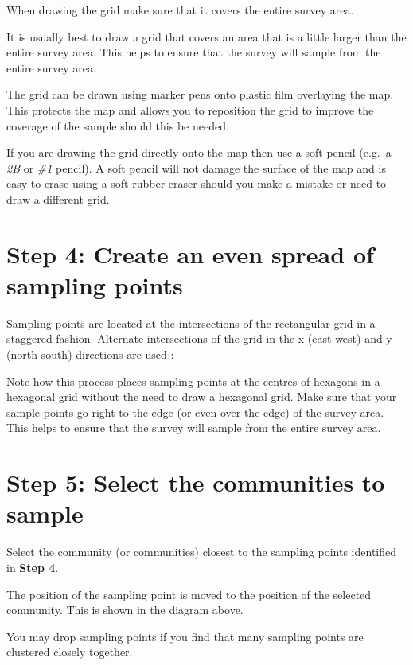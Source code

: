\documentclass[12pt,a4paper]{book}
\theoremstyle{definition}
\theoremstyle{definition}
\theoremstyle{definition}
\theoremstyle{remark}
\begin{document}
When drawing the grid make sure that it covers the entire survey area.

It is usually best to draw a grid that covers an area that is a little
larger than the entire survey area. This helps to ensure that the survey
will sample from the entire survey area.

The grid can be drawn using marker pens onto plastic film overlaying the
map. This protects the map and allows you to reposition the grid to
improve the coverage of the sample should this be needed.

If you are drawing the grid directly onto the map then use a soft pencil
(e.g.~a \emph{2B} or \emph{\#1} pencil). A soft pencil will not damage
the surface of the map and is easy to erase using a soft rubber eraser
should you make a mistake or need to draw a different grid.

\hypertarget{step-4-create-an-even-spread-of-sampling-points}{%
\section{Step 4: Create an even spread of sampling
points}\label{step-4-create-an-even-spread-of-sampling-points}}

Sampling points are located at the intersections of the rectangular grid
in a staggered fashion. Alternate intersections of the grid in the x
(east-west) and y (north-south) directions are used :

Note how this process places sampling points at the centres of hexagons
in a hexagonal grid without the need to draw a hexagonal grid. Make sure
that your sample points go right to the edge (or even over the edge) of
the survey area. This helps to ensure that the survey will sample from
the entire survey area.

\hypertarget{step-5-select-the-communities-to-sample}{%
\section{Step 5: Select the communities to
sample}\label{step-5-select-the-communities-to-sample}}

Select the community (or communities) closest to the sampling points
identified in \textbf{Step 4}.

The position of the sampling point is moved to the position of the
selected community. This is shown in the diagram above.

You may drop sampling points if you find that many sampling points are
clustered closely together.
\end{document}
